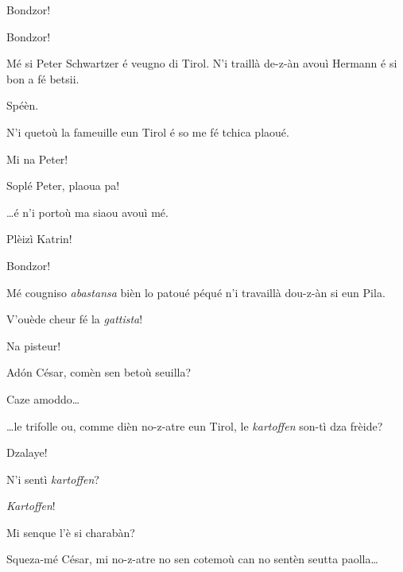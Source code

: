 \begin{drama}
\Peterspeaks{} Bondzor!

\Cesarspeaks Bondzor!

\Peterspeaks Mé si Peter Schwartzer é veugno di Tirol. N'i traillà de-z-àn avouì Hermann é si bon a fé betsii.

\Cesarspeaks Spéèn.

\Peterspeaks N'i quetoù la fameuille eun Tirol é so me fé tchica plaoué.


\Cesarspeaks Mi na Peter!


\Hermannspeaks Soplé Peter, plaoua pa!


\Peterspeaks  \ldots é n'i portoù ma siaou avouì mé.


\Katrinspeaks{} Plèizì Katrin!

\Cesarspeaks{} Bondzor!

\Katrinspeaks Mé cougniso \textit{abastansa} bièn lo patoué péqué n'i travaillà dou-z-àn si eun Pila.

\Cesarspeaks  V'ouède cheur fé la \textit{gattista}!

\Katrinspeaks Na pisteur!

\Hermannspeaks{} Ad\'on César, comèn sen betoù seuilla?

\Cesarspeaks Caze amoddo\ldots

\Hermannspeaks{} \ldots le trifolle ou, comme dièn no-z-atre eun Tirol, le \textit{kartoffen} son-tì dza frèide?

\Cesarspeaks Dzalaye!

\Katrinspeaks N'i sentì \textit{kartoffen}?

\Peterspeaks \textit{Kartoffen}!



\Cesarspeaks Mi senque l'è si charabàn?

\Hermannspeaks{} Squeza-mé César, mi no-z-atre no sen cotemoù can no sentèn seutta paolla\ldots


\end{drama}
